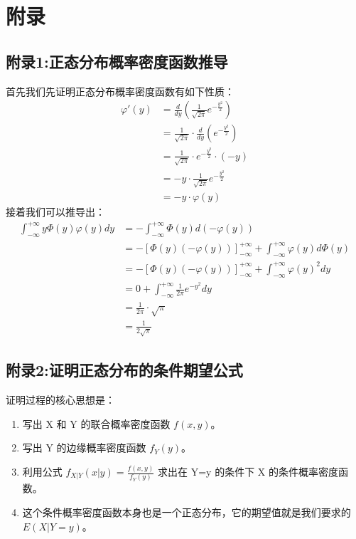 \documentclass[UTF8]{ctexart}
\begin{document}
\section*{附录}

\subsection*{附录1:正态分布概率密度函数推导}
首先我们先证明正态分布概率密度函数有如下性质：
$$
\begin{align*}
    \varphi'(y) &= \frac{d}{dy}\left(\frac{1}{\sqrt{2\pi}}e^{-\frac{y^2}{2}}\right) \\
    &= \frac{1}{\sqrt{2\pi}} \cdot \frac{d}{dy}\left(e^{-\frac{y^2}{2}}\right) \\
    &= \frac{1}{\sqrt{2\pi}} \cdot e^{-\frac{y^2}{2}} \cdot \left(-y\right) \\
    &= -y \cdot \frac{1}{\sqrt{2\pi}}e^{-\frac{y^2}{2}} \\
    &= -y \cdot \varphi(y)
\end{align*}
$$
接着我们可以推导出：
$$
\begin{align*}
    \int_{-\infty}^{+\infty} y\Phi(y)\varphi(y)dy
    &= -\int_{-\infty}^{+\infty} \Phi(y)d(-\varphi(y)) \\
    &= -\left[\Phi(y)(-\varphi(y))\right]_{-\infty}^{+\infty} + \int_{-\infty}^{+\infty} \varphi(y)d\Phi(y) \\
    &= -\left[\Phi(y)(-\varphi(y))\right]_{-\infty}^{+\infty} + \int_{-\infty}^{+\infty} \varphi(y)^2 dy \\
    &= 0 + \int_{-\infty}^{+\infty} \frac{1}{2\pi}e^{-y^2} dy \\
    &= \frac{1}{2\pi} \cdot \sqrt{\pi} \\
    &= \frac{1}{2\sqrt{\pi}}
\end{align*}
$$

\subsection*{附录2:证明正态分布的条件期望公式}
\noindent 证明过程的核心思想是：
\begin{enumerate}
    \item 写出 X 和 Y 的联合概率密度函数 $f(x, y)$。
    \item 写出 Y 的边缘概率密度函数 $f_Y(y)$。
    \item 利用公式 $f_{X|Y}(x|y) = \frac{f(x, y)}{f_Y(y)}$ 求出在 Y=y 的条件下 X 的条件概率密度函数。
    \item 这个条件概率密度函数本身也是一个正态分布，它的期望值就是我们要求的 $E(X|Y=y)$。
\end{enumerate}
\end{document}
